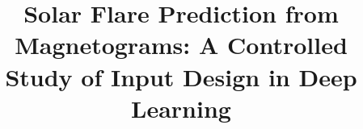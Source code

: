 \documentclass[runningheads]{llncs}
\begin{document}
\newcommand{\best}[1]{\bm{#1}}

\title{Solar Flare Prediction from Magnetograms: A Controlled Study of Input Design in Deep Learning}

\author{ } %
\authorrunning{} %

\institute{ } %

\maketitle

\begin{abstract}

\end{abstract}
\end{document}
